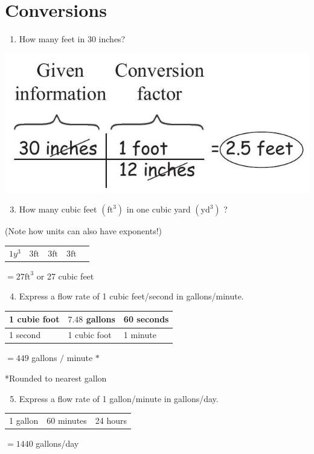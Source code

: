 \documentclass[10pt]{article}
\begin{document}
\section{Conversions}
\begin{enumerate}
  \item How many feet in 30 inches?
\end{enumerate}
\includegraphics[max width=\textwidth]{2022_09_16_4d34b76b97ee13a67df7g-07}

\begin{enumerate}
  \setcounter{enumi}{2}
  \item How many cubic feet $\left(\mathrm{ft}^{3}\right)$ in one cubic yard $\left(\mathrm{yd}^{3}\right)$ ?
\end{enumerate}
(Note how units can also have exponents!)

\begin{tabular}{l|l|l|l|l}
$1 y^{3}$ & $3 \mathrm{ft}$ & $3 \mathrm{ft}$ & $3 \mathrm{ft}$ \\
\end{tabular}$=27 \mathrm{ft}^{3}$ or 27 cubic feet

\begin{enumerate}
  \setcounter{enumi}{3}
  \item Express a flow rate of 1 cubic feet/second in gallons/minute.
\end{enumerate}
\begin{tabular}{l|l|l}
1 cubie foot & $7.48$ gallons & 60 seconds \\
\hline
1 second & 1 cubic foot & 1 minute \\
\hline
\end{tabular}$=449$ gallons $/$ minute $*$

*Rounded to nearest gallon

\begin{enumerate}
  \setcounter{enumi}{4}
  \item Express a flow rate of 1 gallon/minute in gallons/day.
\end{enumerate}
\begin{tabular}{l|l|l}
1 gallon & 60 minutes & 24 hours \\
\end{tabular}$=1440$ gallons/day
\end{document}
